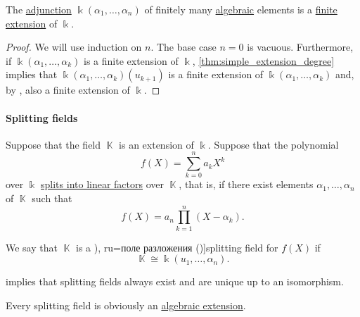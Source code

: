 \begin{proposition}\label{thm:finite_adjunction_finite_extension}
  The \hyperref[def:field_adjunction]{adjunction} \( \Bbbk(\alpha_1, \ldots, \alpha_n) \) of finitely many \hyperref[def:algebraic_element]{algebraic} elements is a \hyperref[def:field_extension_degree]{finite extension} of \( \Bbbk \).
\end{proposition}
\begin{proof}
  We will use induction on \( n \). The base case \( n = 0 \) is vacuous. Furthermore, if \( \Bbbk(\alpha_1, \ldots, \alpha_k) \) is a finite extension of \( \Bbbk \), \cref{thm:simple_extension_degree} implies that \( \Bbbk(\alpha_1, \ldots, \alpha_k)(u_{k+1}) \) is a finite extension of \( \Bbbk(\alpha_1, \ldots, \alpha_k) \) and, by , also a finite extension of \( \Bbbk \).
\end{proof}

\paragraph{Splitting fields}

\begin{definition}\label{def:splitting_field}
  Suppose that the field \( \BbbK \) is an extension of \( \Bbbk \). Suppose that the polynomial
  \begin{equation*}
    f(X) = \sum_{k=0}^n a_k X^k
  \end{equation*}
  over \( \Bbbk \) \hyperref[def:polynomial_splits_into_linear_factors]{splits into linear factors} over \( \BbbK \), that is, if there exist elements \( \alpha_1, \ldots, \alpha_n \) of \( \BbbK \) such that
  \begin{equation*}
    f(X) = a_n \prod_{k=1}^n (X - \alpha_k).
  \end{equation*}

  We say that \( \BbbK \) is a \term[bg=поле на разлагане (\cite[429]{Обрешков1962ВисшаАлгебра}), ru=поле разложения (\cite[def. 9.5.2]{Винберг2014КурсАлгебры})]{splitting field} for \( f(X) \) if
  \begin{equation*}
    \BbbK \cong \Bbbk(u_1, \ldots, \alpha_n).
  \end{equation*}
\end{definition}
\begin{comments}
  \item {} implies that splitting fields always exist and are unique up to an isomorphism.
  \item Every splitting field is obviously an \hyperref[def:algebraic_extension]{algebraic extension}.
\end{comments}

